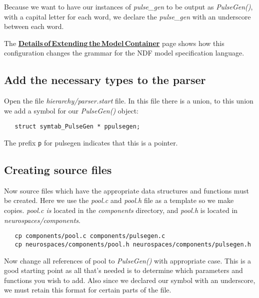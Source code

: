 \documentclass[12pt]{article}
\begin{document}
Because we want to have our instances of {\it pulse\_gen} to be output as {\it PulseGen()}, with a capital letter for each word, we declare the  {\it pulse\_gen} with an underscore between each word.

The \href{../genesis-extend-model-container-detail/genesis-extend-model-container-detail.tex}{\bf Details\,of\,Extending\,the\,Model\,Container} page shows how this configuration changes the grammar for the NDF model specification language.

\subsection*{Add the necessary types to the parser}

Open the file {\it hierarchy/parser.start} file. In this file there is a union, to this union we add a symbol for our {\it PulseGen()} object:
\begin{verbatim}
   struct symtab_PulseGen * ppulsegen;
\end{verbatim}
The prefix {\tt p} for pulsegen indicates that this is a pointer.

\subsection*{Creating source files}

Now source files which have the appropriate data structures and functions must be created. Here we use the {\it pool.c} and {\it pool.h} file as a template so we make copies. {\it pool.c is} located in the {\it components} directory, and {\it pool.h} is located in {\it neurospaces/components}.
\begin{verbatim}
   cp components/pool.c components/pulsegen.c
   cp neurospaces/components/pool.h neurospaces/components/pulsegen.h
\end{verbatim}
Now change all references of pool to {\it PulseGen()} with appropriate case. This is a good starting point as all that's needed is to determine which parameters and functions you wish to add. Also since we declared our symbol with an underscore, we must retain this format for certain parts of the file.
\end{document}
